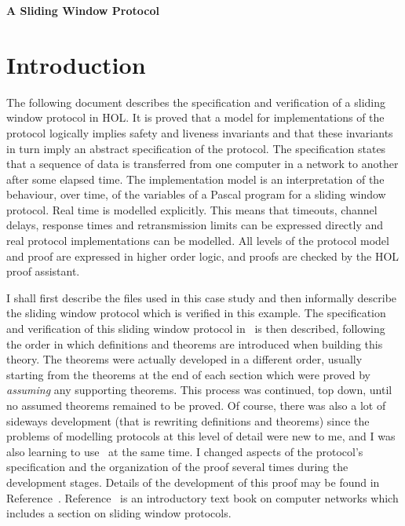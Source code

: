 \setlength{\unitlength}{1mm}
\vskip10mm
\begin{center}\LARGE\bf
A Sliding Window Protocol
\end{center}
\vskip10mm

\section{Introduction}

The following document describes the specification and verification of a
sliding window protocol in HOL.  It is proved that a model for implementations
of the protocol logically implies safety and liveness invariants and that these
invariants in turn imply an abstract specification of the protocol.  The
specification states that a sequence of data is transferred from one computer
in a network to another after some elapsed time.  The implementation model is
an interpretation of the behaviour, over time, of the variables of a Pascal
program for a sliding window protocol.  Real time is modelled explicitly.  This
means that timeouts, channel delays, response times and retransmission limits
can be expressed directly and real protocol implementations can be modelled.
All levels of the protocol model and proof are expressed in higher order logic,
and proofs are checked by the HOL proof assistant.


I shall first describe the files used in this case study and then informally
describe the sliding window protocol which is verified in this example.  The
specification and verification of this sliding window protocol in \HOL\ is then
described, following the order in which definitions and theorems are introduced
when building this theory.  The theorems were actually developed in a different
order, usually starting from the theorems at the end of each section which were
proved by {\em assuming} any supporting theorems.  This process was continued,
top down, until no assumed theorems remained to be proved.  Of course, there
was also a lot of sideways development (that is rewriting definitions and
theorems) since the problems of modelling protocols at this level of detail
were new to me, and I was also learning to use \HOL\ at the same time.  I
changed aspects of the protocol's specification and the organization of the
proof several times during the development stages.  Details of the development
of this proof may be found in Reference~\cite{cardelloliver}.
Reference~\cite{bertsekas} is an introductory text book on computer networks
which includes a section on sliding window protocols.

